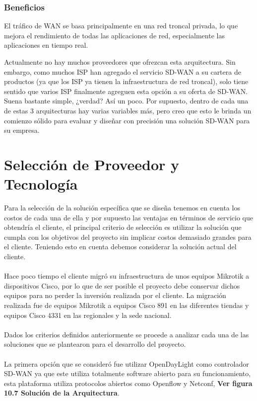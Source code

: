 \subsubsection{Beneficios}
\label{sec:Beneficios}

El tráfico de WAN se basa principalmente en una red troncal privada, lo que mejora el rendimiento de todas las aplicaciones de red, especialmente las aplicaciones en tiempo real.

Actualmente no hay muchos proveedores que ofrezcan esta arquitectura. Sin embargo, como muchos ISP han agregado el servicio SD-WAN a su cartera de productos (ya que los ISP ya tienen la infraestructura de red troncal), solo tiene sentido que varios ISP finalmente agreguen esta opción a su oferta de SD-WAN. Suena bastante simple, ¿verdad? Así un poco. Por supuesto, dentro de cada una de estas 3 arquitecturas hay varias variables más, pero creo que esto le brinda un comienzo sólido para evaluar y diseñar con precisión una solución SD-WAN para su empresa.


\section{Selección de Proveedor y Tecnología} %
\label{sec:Selección de Proveedor y Tecnología}

Para la selección de la solución específica que se diseña tenemos en cuenta los costos de cada una de ella y por supuesto las ventajas en términos de servicio que obtendría el cliente, el principal criterio de selección es utilizar la solución que cumpla con los objetivos del proyecto sin implicar costos demasiado grandes para el cliente. Teniendo esto en cuenta debemos considerar la solución actual del cliente.
\\
\\
Hace poco tiempo el cliente migró su infraestructura de unos equipos Mikrotik a dispositivos Cisco, por lo que de ser posible el proyecto debe conservar dichos equipos para no perder la inversión realizada por el cliente. La migración realizada fue de equipos Mikrotik a equipos Cisco 891 en las diferentes tiendas y equipos Cisco 4331 en las regionales y la sede nacional.
\\
\\
Dados los criterios definidos anteriormente se procede a analizar cada una de las soluciones que se plantearon para el desarrollo del proyecto.
\\
\\
La primera opción que se consideró fue utilizar OpenDayLight como controlador SD-WAN ya que este utiliza totalmente software abierto para su funcionamiento, esta plataforma utiliza protocolos abiertos como  Openflow y Netconf, \textbf{Ver figura 10.7 Solución de la Arquitectura}.



